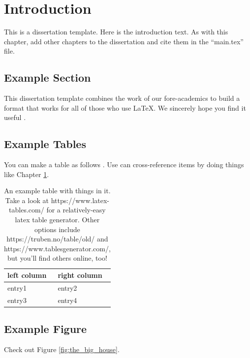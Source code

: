 \chapter{Introduction}
\label{chpt:introduction}

This is a dissertation template. Here is the introduction text. As with this chapter, add other chapters to the dissertation and cite them in the ``main.tex'' file.


\section{Example Section}
\label{sec:examplesec1}

This dissertation template combines the work of our fore-academics to build a format that works for all of those who use \LaTeX \cite{jefferson2019policing}. We sincerely hope you find it useful \cite{shannon1948mathematical}.

\blindtext


\section{Example Tables}
\label{sec:examplesec2}

You can make a table as follows \cite{ong1997gilbert}. Use can cross-reference items by doing things like Chapter \ref{chpt:introduction}.

\blindtext

\begin{table}[ht]
    \begin{tabular}{l|l}
        \textbf{left column} & \textbf{right column} \\ \hline
        entry1 & entry2 \\
        entry3 & entry4
    \end{tabular}
    \caption{An example table with things in it. Take a look at https://www.latex-tables.com/ for a relatively-easy latex table generator. Other options include https://truben.no/table/old/ and https://www.tablesgenerator.com/, but you'll find others online, too!}
    \label{tab:my-table}
\end{table}

\blindtext


\section{Example Figure}
\label{sec:examplesec3}

Check out Figure \ref{fig:the_big_house}. \blindtext

